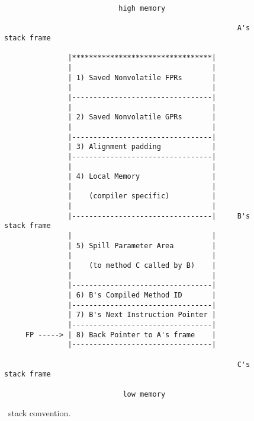 
\begin{figure}
\begin{verbatim}
                           high memory

                                                       A's stack frame

               |*********************************|
               |                                 |
               | 1) Saved Nonvolatile FPRs       |
               |                                 |
               |---------------------------------|
               |                                 |
               | 2) Saved Nonvolatile GPRs       |
               |                                 |
               |---------------------------------|
               | 3) Alignment padding            |
               |---------------------------------|
               |                                 |
               | 4) Local Memory                 |
               |                                 |
               |    (compiler specific)          |
               |                                 |
               |---------------------------------|     B's stack frame
               |                                 |
               | 5) Spill Parameter Area         |
               |                                 |
               |    (to method C called by B)    |
               |                                 |
               |---------------------------------|
               | 6) B's Compiled Method ID       |
               |---------------------------------|
               | 7) B's Next Instruction Pointer |
               |---------------------------------|
     FP -----> | 8) Back Pointer to A's frame    |
               |---------------------------------|

                                                       C's stack frame

                            low memory

\end{verbatim}
\label{fig:stackframe}
\caption{\jp\ stack convention.}
\end{figure}

